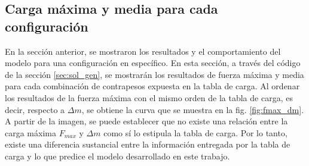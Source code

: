 %
 
\newpage
 
\subsection{Carga máxima y media para cada configuración} 

En la sección anterior, se mostraron los resultados y el comportamiento del modelo para una configuración en específico. En esta sección, a través del código de la sección \ref{sec:sol_gen}, se mostrarán los resultados de fuerza máxima y media para cada combinación de contrapesos expuesta en la tabla de carga. Al ordenar los resultados de la fuerza máxima con el mismo orden de la tabla de carga, es decir, respecto a $\Delta m$, se obtiene la curva que se muestra en la fig. \ref{fig:fmax_dm}. A partir de la imagen, se puede establecer que no existe una relación entre la carga máxima $F_{max}$ y $\Delta m$ como sí lo estipula la tabla de carga. Por lo tanto, existe una diferencia sustancial entre la información entregada por la tabla de carga y lo que predice el modelo desarrollado en este trabajo. 


